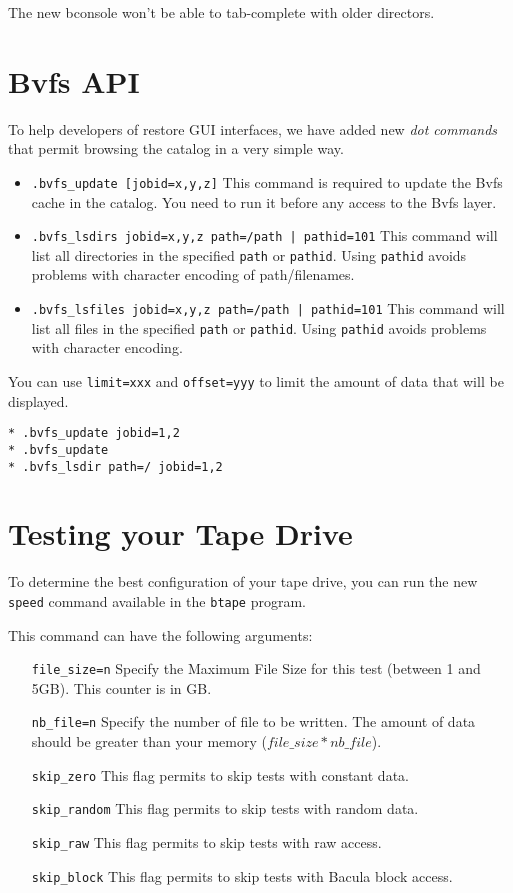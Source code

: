 The new bconsole won't be able to tab-complete with older directors.

\section{Bvfs API}
\label{sec:bvfs}

To help developers of restore GUI interfaces, we have added new \textsl{dot
  commands} that permit browsing the catalog in a very simple way.

\begin{itemize}
\item \texttt{.bvfs\_update [jobid=x,y,z]} This command is required to update
  the Bvfs cache in the catalog. You need to run it before any access to the
  Bvfs layer.

\item \texttt{.bvfs\_lsdirs jobid=x,y,z path=/path | pathid=101} This command
  will list all directories in the specified \texttt{path} or
  \texttt{pathid}. Using \texttt{pathid} avoids problems with character
  encoding of path/filenames.

\item \texttt{.bvfs\_lsfiles jobid=x,y,z path=/path | pathid=101} This command
  will list all files in the specified \texttt{path} or \texttt{pathid}. Using
  \texttt{pathid} avoids problems with character encoding.
\end{itemize}

You can use \texttt{limit=xxx} and \texttt{offset=yyy} to limit the amount of
data that will be displayed.

\begin{verbatim}
* .bvfs_update jobid=1,2
* .bvfs_update
* .bvfs_lsdir path=/ jobid=1,2
\end{verbatim}

\section{Testing your Tape Drive}
\label{sec:btapespeed}

To determine the best configuration of your tape drive, you can run the new
\texttt{speed} command available in the \texttt{btape} program.

This command can have the following arguments:
\begin{itemize}
\item[\texttt{file\_size=n}] Specify the Maximum File Size for this test
  (between 1 and 5GB). This counter is in GB.
\item[\texttt{nb\_file=n}] Specify the number of file to be written. The amount
  of data should be greater than your memory ($file\_size*nb\_file$).
\item[\texttt{skip\_zero}] This flag permits to skip tests with constant
  data.
\item[\texttt{skip\_random}] This flag permits to skip tests with random
  data.
\item[\texttt{skip\_raw}] This flag permits to skip tests with raw access.
\item[\texttt{skip\_block}] This flag permits to skip tests with Bacula block
  access.
\end{itemize}

